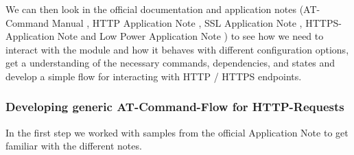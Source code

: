 We can then look in the official documentation and application notes (AT-Command Manual \cite{SIM7000E_AT_COMMAND_MAUAL}, HTTP Application Note \cite{SIM7000E_HTTP_APPLICATION_NOTE} , SSL Application Note \cite{SIM7000E_SSL_APPLICATION_NOTE}, HTTPS-Application Note \cite{SIM7000E_HTTPS_APPLICATION_NOTE} and Low Power Application Note \cite{SIM7000E_LOW_POWER_APPLICATION_NOTE}) to see how we need to interact with the module and how it behaves with different configuration options, get a understanding of the necessary commands, dependencies, and states and develop a simple flow for interacting with HTTP / HTTPS endpoints.

\subsubsection{Developing generic AT-Command-Flow for HTTP-Requests}
In the first step we worked with samples from the official Application Note \cite{SIM7000E_HTTP_APPLICATION_NOTE} to get familiar with the different notes. 
